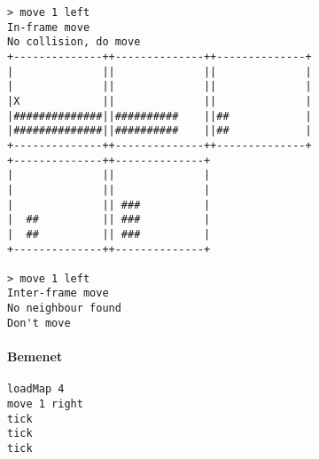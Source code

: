 \begin{verbatim}
> move 1 left
In-frame move
No collision, do move
+--------------++--------------++--------------+
|              ||              ||              |
|              ||              ||              |
|X             ||              ||              |
|##############||##########    ||##            |
|##############||##########    ||##            |
+--------------++--------------++--------------+
+--------------++--------------+                
|              ||              |                
|              ||              |                
|              || ###          |                
|  ##          || ###          |                
|  ##          || ###          |                
+--------------++--------------+                

> move 1 left
Inter-frame move
No neighbour found
Don't move
\end{verbatim}
		       
		        \paragraph*{Bemenet}
\begin{verbatim}
loadMap 4
move 1 right
tick
tick
tick
\end{verbatim}
